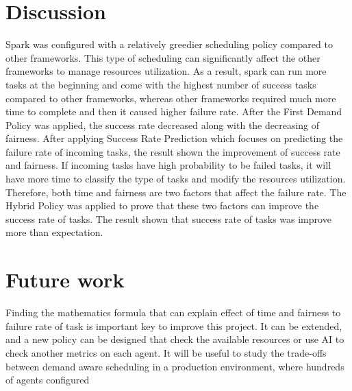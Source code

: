 \documentclass[12pt,oneside,openright,a4paper]{cpe-english-project}
\begin{document}
\section{Discussion}
\hspace{10mm}Spark was configured with a relatively greedier scheduling policy compared to other frameworks. This type of scheduling can significantly affect the other frameworks to manage resources utilization. As a result, spark can run more tasks at the beginning and come with the highest number of success tasks compared to other frameworks, whereas other frameworks required much more time to complete and then it caused higher failure rate. After the First Demand Policy was applied, the success rate decreased along with the decreasing of fairness. After applying Success Rate Prediction which focuses on predicting the failure rate of incoming tasks, the result shown the improvement of success rate and fairness. If incoming tasks have high probability to be failed tasks, it will have more time to classify the type of tasks and modify the resources utilization. Therefore, both time and fairness are two factors that affect the failure rate. The Hybrid Policy was applied to prove that these two factors can improve the success rate of tasks. The result shown that success rate of tasks was improve more than expectation.

\newpage
\section{Future work}
\hspace{10mm}Finding the mathematics formula that can explain effect of time and fairness to failure rate of task is important key to improve this project.
\hspace{10mm}It can be extended, and a new policy can be designed that check the available resources or use AI to check another metrics on each agent.
\hspace{10mm}It will be useful to study the trade-offs between demand aware scheduling in a production environment, where hundreds of agents configured

\nocite{*}


\end{document}
